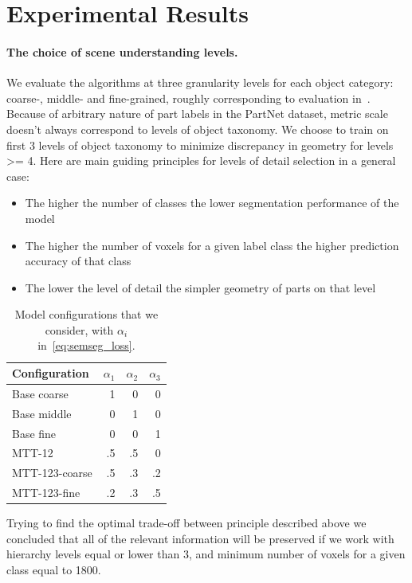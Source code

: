 \section{Experimental Results}
\label{sec:results}

\paragraph{The choice of scene understanding levels. }
\label{results:levels}
We evaluate the algorithms at three granularity levels for each object category: coarse-, middle- and fine-grained, roughly corresponding to evaluation in~\cite{mo2019partnet}. 
Because of arbitrary nature of part labels in the PartNet dataset, metric scale doesn't always correspond to levels of object taxonomy. We choose to train on first 3 levels of object taxonomy to minimize discrepancy in geometry for levels >= 4.
Here are main guiding principles for levels of detail selection in a general case:
\begin{itemize}
    \item The higher the number of classes the lower segmentation performance of the model
    \item The higher the number of voxels for a given label class the higher prediction accuracy of that class
    \item The lower the level of detail the simpler geometry of parts on that level 
\end{itemize}

\begin{table}
\caption{Model configurations that we consider, with $\alpha_i$ in~\eqref{eq:semseg_loss}.}
\begin{tabular}{lrrr}\\\toprule  
Configuration   & $\alpha_1$ & $\alpha_2$ & $\alpha_3$ \\
\midrule
Base coarse     & 1 & 0 & 0 \\
Base middle     & 0 & 1 & 0 \\
Base fine       & 0 & 0 & 1 \\
MTT-12          & .5 & .5 &  0 \\
MTT-123-coarse  & .5 & .3 & .2 \\
MTT-123-fine    & .2 & .3 & .5 \\
\bottomrule
\end{tabular}
\label{table:configurations}
\end{table} 


Trying to find the optimal trade-off between principle described above we concluded that all of the relevant information will be preserved if we work with hierarchy levels equal or lower than 3, and minimum number of voxels for a given class equal to 1800.

